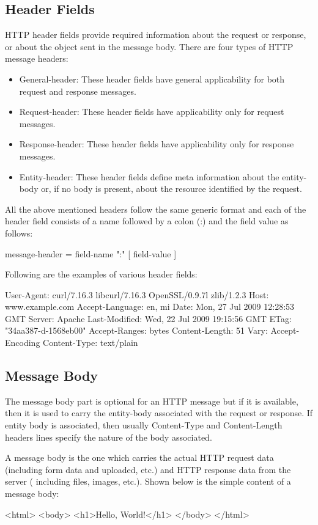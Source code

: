 \documentclass[a4paper,11pt,bahasa]{extarticle}
\begin{document}
\subsection{Header Fields}

HTTP header fields provide required information about the request or response, or about the object sent 
in the message body. There are four types of HTTP message headers:
\begin{itemize}
\item General-header: These header fields have general applicability for both request
  and response messages.
\item Request-header: These header fields have applicability only for request messages.
\item Response-header: These header fields have applicability only for response messages.
\item Entity-header: These header fields define meta information about the entity-body or, if no body is 
present, about the resource identified by the request.
\end{itemize}

All the above mentioned headers follow the same generic format and each of the header field consists of 
a name followed by a colon (:) and the field value as follows:
\begin{textcode}
message-header = field-name ":" [ field-value ]
\end{textcode}
Following are the examples of various header fields:
\begin{textcode}
User-Agent: curl/7.16.3 libcurl/7.16.3 OpenSSL/0.9.7l zlib/1.2.3
Host: www.example.com
Accept-Language: en, mi
Date: Mon, 27 Jul 2009 12:28:53 GMT
Server: Apache
Last-Modified: Wed, 22 Jul 2009 19:15:56 GMT
ETag: "34aa387-d-1568eb00"
Accept-Ranges: bytes
Content-Length: 51
Vary: Accept-Encoding
Content-Type: text/plain
\end{textcode}

\subsection{Message Body}
The message body part is optional for an HTTP message but if it is available, then it is used to carry 
the entity-body associated with the request or response. If entity body is associated, then usually 
Content-Type and Content-Length headers lines specify the nature of the body associated.

A message body is the one which carries the actual HTTP request data (including form data and uploaded, 
etc.) and HTTP response data from the server ( including files, images, etc.). Shown below is the simple 
content of a message body:
\begin{textcode}
<html>
   <body>
      <h1>Hello, World!</h1>
   </body>
</html>
\end{textcode}
\end{document}

